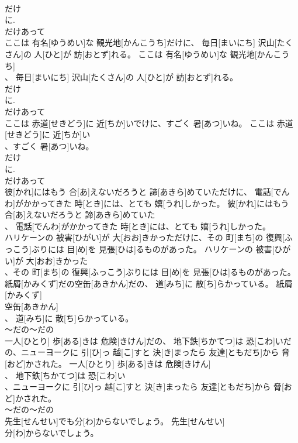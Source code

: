 \documentclass[8pt]{extreport}
\begin{document}
\begin{CJK}{UTF8}{min}
\\	だけ 
\\	に. 
\\	だけあって
\\	ここは 有名[ゆうめい]な 観光地[かんこうち]だけに、 毎日[まいにち] 沢山[たくさん]の 人[ひと]が 訪[おとず]れる。	ここは 有名[ゆうめい]な 観光地[かんこうち]
\\	、 毎日[まいにち] 沢山[たくさん]の 人[ひと]が 訪[おとず]れる。	
\\	だけ 
\\	に. 
\\	だけあって
\\	ここは 赤道[せきどう]に 近[ちか]いでけに、すごく 暑[あつ]いね。	ここは 赤道[せきどう]に 近[ちか]い
\\	、すごく 暑[あつ]いね。	
\\	だけ 
\\	に. 
\\	だけあって
\\	彼[かれ]にはもう 合[あ]えないだろうと 諦[あきら]めていただけに、 電話[でんわ]がかかってきた 時[とき]には、とても 嬉[うれ]しかった。	彼[かれ]にはもう 合[あ]えないだろうと 諦[あきら]めていた
\\	、 電話[でんわ]がかかってきた 時[とき]には、とても 嬉[うれ]しかった。	
\\	ハリケーンの 被害[ひがい]が 大[おお]きかっただけに、その 町[まち]の 復興[ふっこう]ぶりには 目[め]を 見張[ひは]るものがあった。	ハリケーンの 被害[ひがい]が 大[おお]きかった
\\	、その 町[まち]の 復興[ふっこう]ぶりには 目[め]を 見張[ひは]るものがあった。	
\\	紙屑[かみくず]だの空缶[あきかん]だの、 道[みち]に 散[ち]らかっている。	紙屑[かみくず]
\\	空缶[あきかん]
\\	、 道[みち]に 散[ち]らかっている。	
\\	～だの～だの 
\\	一人[ひとり] 歩[ある]きは 危険[きけん]だの、 地下鉄[ちかてつ]は 恐[こわ]いだの、ニューヨークに 引[ひ]っ 越[こ]すと 決[き]まったら 友達[ともだち]から 脅[おど]かされた。	一人[ひとり] 歩[ある]きは 危険[きけん]
\\	、 地下鉄[ちかてつ]は 恐[こわ]い
\\	、ニューヨークに 引[ひ]っ 越[こ]すと 決[き]まったら 友達[ともだち]から 脅[おど]かされた。	
\\	～だの～だの 
\\	先生[せんせい]でも分[わ]からないでしょう。	先生[せんせい]
\\	分[わ]からないでしょう。	

\end{CJK}
\end{document}
